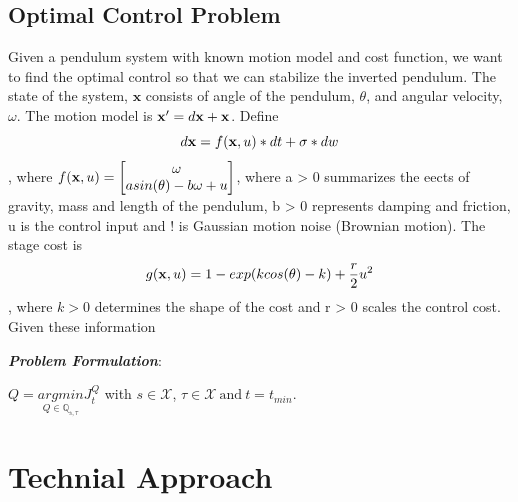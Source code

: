 \documentclass[letterpaper, 10 pt, conference]{ieeeconf}  %
\begin{document}
\subsection{Optimal Control Problem}
Given a pendulum system with known motion model and cost function, we want to find the optimal control so that we can stabilize the 
inverted pendulum. The state of the system, $\mathbf{x}$ consists of angle of the pendulum, $\theta$, and angular velocity, $\omega$. 
The motion model is $\mathbf{x}' = d\mathbf{x} + \mathbf{x}$. 
Define 
\begin{equation}
d\mathbf{x} = f(\mathbf{x}, u) * dt + \sigma * dw
\end{equation}, where $f(\mathbf{x}, u) = \begin{bmatrix}
\omega \\ 
asin(\theta) - b\omega + u
\end{bmatrix}$, where a > 0 summarizes the eects of gravity, mass and length of the pendulum, b > 0 represents damping and friction, 
u is the control input and ! is Gaussian motion noise (Brownian motion). The stage cost is 
\begin{equation}
g(\mathbf{x}, u) = 1 - exp(kcos(\theta) - k) + \frac{r}{2}u^2
\end{equation}, where $k>0$ determines the shape of the cost and r > 0 scales the control cost. Given these information

\textbf{\textit{Problem Formulation}}: 

\begin{math}
Q = \underset{Q \in \mathbb{Q_{s,\tau}}}{argmin}J^Q_t
\end{math} with $s\in \mathcal{X}$, $\tau \in \mathcal{X} \ \text{and} \ t = t_{min}$.



\section{Technial Approach}
\end{document}

